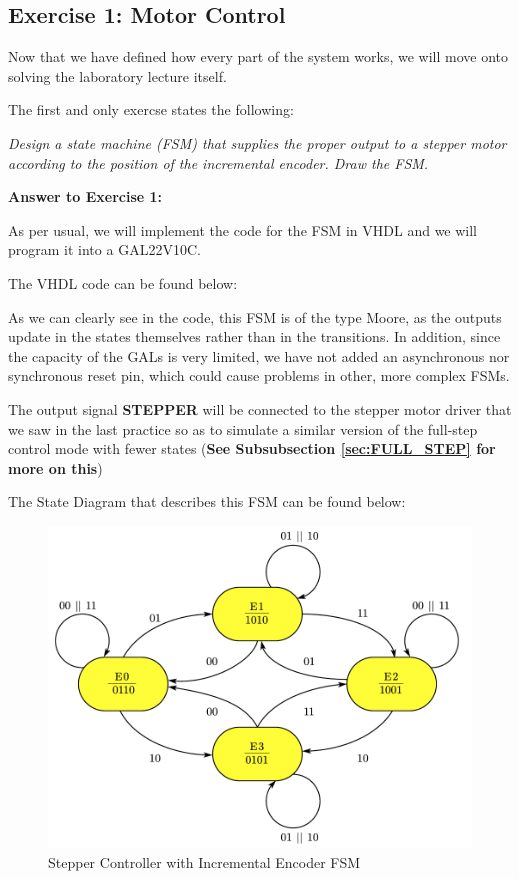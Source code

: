 \clearpage

\subsection{Exercise 1: Motor Control}

Now that we have defined how every part of the system works, we will move onto solving the laboratory lecture itself. \medskip

The first and only exercse states the following:\medskip

\textit{Design a state machine (FSM) that supplies the proper output to a stepper motor according to the position of the incremental encoder. Draw the FSM.} \medskip

\textbf{\large Answer to Exercise 1:}\medskip

As per usual, we will implement the code for the FSM in VHDL and we will program it into a GAL22V10C. \medskip

The VHDL code can be found below:\medskip


As we can clearly see in the code, this FSM is of the type Moore, as the outputs update in the states themselves rather than in the transitions. In addition, since the capacity of the GALs is very limited, we have not added an asynchronous nor synchronous reset pin, which could cause problems in other, more complex FSMs.  \medskip

The output signal \textbf{STEPPER} will be connected to the stepper motor driver that we saw in the last practice so as to simulate a similar version of the full-step control mode with fewer states (\textbf{See Subsubsection \ref{sec:FULL_STEP} for more on this})\medskip

The State Diagram that describes this FSM can be found below:

\begin{figure}[H]
    \centering
    \includegraphics[scale = 0.75]{Graphics/Practice 4/EXERCISE_FSM.pdf}
    \caption{Stepper Controller with Incremental Encoder FSM}
    \label{fig:ENCODER_FSM}
\end{figure}

\clearpage